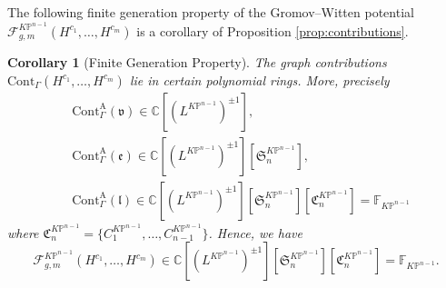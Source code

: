 \documentclass[12pt]{amsart}
\newtheorem{cor}[prop]{Corollary}
\numberwithin{equation}{section}
\newcommand{\KP}{K\mathbb{P}}
\begin{document}
The following finite generation property of the Gromov--Witten potential $\mathcal{F}_{g, m}^{\KP^{n-1}}\left(H^{c_{1}}, \ldots, H^{c_{m}}\right)$ is a corollary of Proposition \ref{prop:contributions}.


\begin{cor}[Finite Generation Property]\label{cor:VertexEdgeCont}
The graph contributions $\mathrm{Cont}_{\Gamma}\left(H^{c_{1}}, \ldots, H^{c_{m}}\right)$ lie in certain polynomial rings. More, precisely
\begin{equation*}
\begin{split}
&\mathrm{Cont}_{\Gamma}^{\mathrm{A}}(\mathfrak{v})\in\mathbb{C}[(L^{\KP^{n-1}})^{\pm{1}}],\\
&\mathrm{Cont}_{\Gamma}^{\mathrm{A}}(\mathfrak{e})\in\mathbb{C}[(L^{\KP^{n-1}})^{\pm{1}}][\mathfrak{S}_n^{\KP^{n-1}}],\\
&\mathrm{Cont}_{\Gamma}^{\mathrm{A}}(\mathfrak{l})\in\mathbb{C}[(L^{\KP^{n-1}})^{\pm{1}}][\mathfrak{S}_n^{\KP^{n-1}}][\mathfrak{C}_n^{\KP^{n-1}}]=\mathds{F}_{\KP^{n-1}}
\end{split}
\end{equation*}
where $\mathfrak{C}_n^{\KP^{n-1}}=\{C^{\KP^{n-1}}_1,\ldots,C^{\KP^{n-1}}_{n-1}\}$. Hence, we have
\begin{equation*}
\mathcal{F}_{g, m}^{\KP^{n-1}}\left(H^{c_{1}}, \ldots, H^{c_{m}}\right)\in\mathbb{C}[(L^{\KP^{n-1}})^{\pm{1}}][\mathfrak{S}_n^{\KP^{n-1}}][\mathfrak{C}_n^{\KP^{n-1}}]=\mathds{F}_{\KP^{n-1}}.
\end{equation*}
\end{cor}
\end{document}
